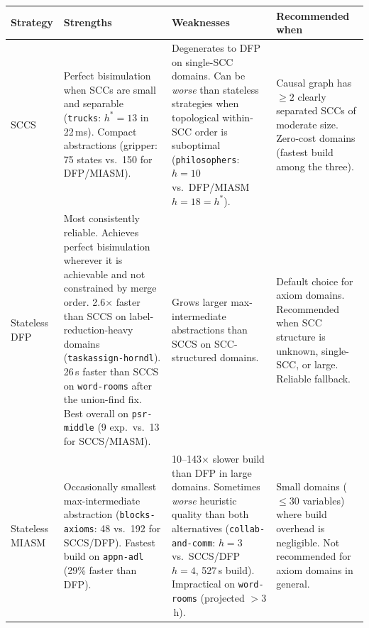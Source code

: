 \documentclass[11pt,a4paper]{article}
\begin{document}
\begin{center}
\small
\begin{tabular}{lp{4.2cm}p{4.2cm}p{3.8cm}}
\toprule
\textbf{Strategy} & \textbf{Strengths} & \textbf{Weaknesses}
  & \textbf{Recommended when} \\
\midrule
SCCS      & Perfect bisimulation when SCCs are small and separable
           (\texttt{trucks}: $h^* = 13$ in 22\,ms).
           Compact abstractions (gripper: 75 states vs.\ 150 for DFP/MIASM).
           & Degenerates to DFP on single-SCC domains.
             Can be \emph{worse} than stateless strategies when topological
             within-SCC order is suboptimal (\texttt{philosophers}: $h=10$
             vs.\ DFP/MIASM $h=18=h^*$).
           & Causal graph has $\geq 2$ clearly separated SCCs of moderate size.
             Zero-cost domains (fastest build among the three). \\[4pt]
Stateless DFP & Most consistently reliable.
               Achieves perfect bisimulation wherever it is achievable
               and not constrained by merge order.
               2.6$\times$ faster than SCCS on label-reduction-heavy domains
               (\texttt{taskassign-horndl}).
               26\,s faster than SCCS on \texttt{word-rooms} after the
               union-find fix.
               Best overall on \texttt{psr-middle} (9 exp.\ vs.\ 13 for SCCS/MIASM).
             & Grows larger max-intermediate abstractions than SCCS on
               SCC-structured domains.
             & Default choice for axiom domains.  Recommended when SCC structure
               is unknown, single-SCC, or large.  Reliable fallback. \\[4pt]
Stateless MIASM & Occasionally smallest max-intermediate abstraction
                  (\texttt{blocks-axioms}: 48 vs.\ 192 for SCCS/DFP).
                  Fastest build on \texttt{appn-adl} (29\% faster than DFP).
                & 10--143$\times$ slower build than DFP in large domains.
                  Sometimes \emph{worse} heuristic quality than both alternatives
                  (\texttt{collab-and-comm}: $h=3$ vs.\ SCCS/DFP $h=4$,
                  527\,s build).
                  Impractical on \texttt{word-rooms} (projected $>3$\,h).
                & Small domains ($\leq 30$ variables) where build overhead is
                  negligible.  Not recommended for axiom domains in general. \\
\bottomrule
\end{tabular}
\end{center}
\end{document}
